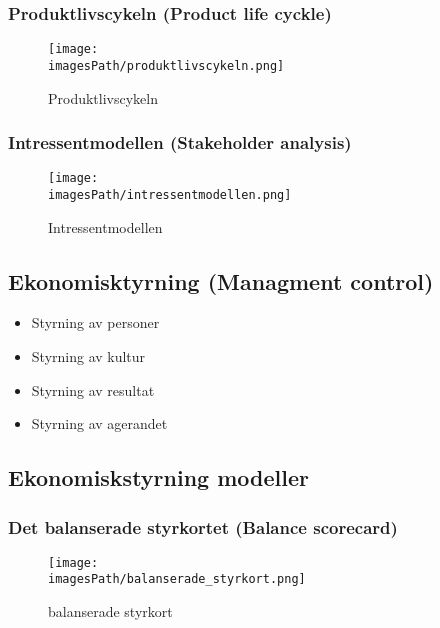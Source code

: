 \documentclass{article}
\newcommand{\imagesPath}{images}
\begin{document}
\newpage
\subsubsection{Produktlivscykeln (Product life cyckle)}
\begin{figure}[!h]
    \centering
    \texttt{[image: \\imagesPath/produktlivscykeln.png]}
    \caption{Produktlivscykeln}
\end{figure}

\subsubsection{Intressentmodellen (Stakeholder analysis)}
\begin{figure}[!h]
    \centering
    \texttt{[image: \\imagesPath/intressentmodellen.png]}
    \caption{Intressentmodellen}
\end{figure}


\subsection{Ekonomisktyrning (Managment control)}
\begin{itemize}
    \item Styrning av personer
    \item Styrning av kultur
    \item Styrning av resultat
    \item Styrning av agerandet
\end{itemize}

\subsection{Ekonomiskstyrning modeller}
\subsubsection{Det balanserade styrkortet (Balance scorecard)}
\begin{figure}[!h]
    \centering
    \texttt{[image: \\imagesPath/balanserade\_styrkort.png]}
    \caption{balanserade styrkort}
\end{figure}
\end{document}
